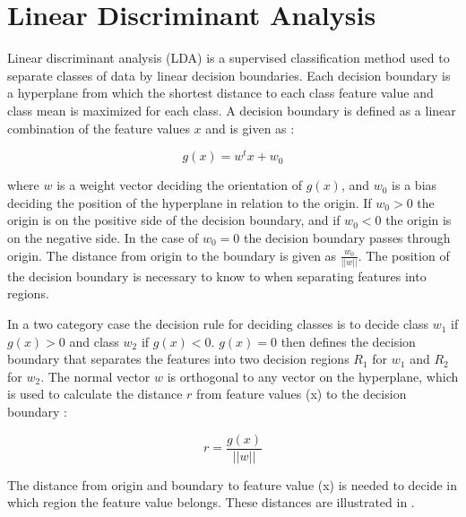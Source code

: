 \section{Linear Discriminant Analysis}

Linear discriminant analysis (LDA) is a supervised classification method used to separate classes of data by linear decision boundaries. Each decision boundary is a hyperplane from which the shortest distance to each class feature value and class mean is maximized for each class. A decision boundary is defined as a linear combination of the feature values $x$ and is given as \cite{Duda2000}:

\begin{equation}
g(x) = w^tx +w_0
\end{equation}

where $w$ is a weight vector deciding the orientation of $g(x)$, and $w_0$ is a bias deciding the position of the hyperplane in relation to the origin. If $w_0 > 0$ the origin is on the positive side of the decision boundary, and if $w_0 < 0$ the origin is on the negative side. In the case of $w_0 = 0$ the decision boundary passes through origin. The distance from origin to the boundary is given as $\frac{w_0}{||w||}$. The position of the decision boundary is necessary to know to when separating features into regions. \cite{Duda2000}

In a two category case the decision rule for deciding classes is to decide class $w_1$ if $g(x) > 0$ and class $w_2$ if $g(x) < 0$. $g(x) = 0$ then defines the decision boundary that separates the features into two decision regions $R_1$ for $w_1$ and $R_2$ for $w_2$. The normal vector $w$ is orthogonal to any vector on the hyperplane, which is used to calculate the distance $r$ from feature values (x) to the decision boundary \cite{Duda2000}:

\begin{equation} \label{eq:featureValueDistance}
r = \frac{g(x)}{||w||}
\end{equation} 

The distance from origin and boundary to feature value (x) is needed to decide in which region the feature value belongs. \cite{Duda2000} These distances are illustrated in .

